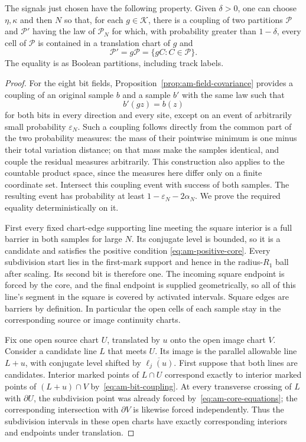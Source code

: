\begin{lemma}\label{lem:am-partition-coupling}
The signals just chosen have the following property.  Given $\delta>0$,
one can choose $\eta,\kappa$ and then $N$ so that, for each
$g\in\mathcal K$, there is a coupling of two partitions $\mathcal P$ and
$\mathcal P'$ having the law of $\mathcal P_N$ for which, with probability
greater than $1-\delta$, every cell of $\mathcal P$ is contained in a
translation chart of $g$ and
\[
 \mathcal P'=g\mathcal P=\{gC:C\in\mathcal P\}.
\]
The equality is as Boolean partitions, including track labels.
\end{lemma}

\begin{proof}
For the eight bit fields, Proposition~\ref{prop:am-field-covariance}
provides a coupling of an original sample $b$ and a sample $b'$ with the
same law such that
\begin{equation}\label{eq:am-bit-coupling}
 b'(gz)=b(z)
\end{equation}
for both bits in every direction and every site, except on an event of
arbitrarily small probability $\varepsilon_N$.  Such a coupling follows
directly from the common part of the two probability measures: the mass
of their pointwise minimum is one minus their total variation distance;
on that mass make the samples identical, and couple the residual measures
arbitrarily.  This construction also applies to the countable product
space, since the measures here differ only on a finite coordinate set.
Intersect this coupling event with success of both samples.  The resulting
event has probability at least $1-\varepsilon_N-2\alpha_N$.
We prove the required equality deterministically on it.

First every fixed chart-edge supporting line meeting the square interior
is a full barrier in both samples for large $N$.  Its conjugate level is
bounded, so it is a candidate and satisfies the positive condition
\eqref{eq:am-positive-core}.  Every subdivision start lies in the first-mark
support and hence in the radius-$R_1$ ball after scaling.  Its second bit
is therefore one.  The incoming square endpoint is forced by the core,
and the final endpoint is supplied geometrically, so all of this line's
segment in the square is covered by activated intervals.  Square edges
are barriers by definition.  In particular the open cells of each sample
stay in the corresponding source or image continuity charts.

Fix one open source chart $U$, translated by $u$ onto the open image chart
$V$.  Consider a candidate line $L$ that meets $U$.  Its image is the
parallel allowable line $L+u$, with conjugate level shifted by
$\overline{\ell_j(u)}$.  First suppose that both lines are candidates.
Interior marked points of $L\cap U$ correspond exactly to interior marked
points of $(L+u)\cap V$ by~\eqref{eq:am-bit-coupling}.  At every transverse
crossing of $L$ with $\partial U$, the subdivision point was already
forced by~\eqref{eq:am-core-equations}; the corresponding intersection
with $\partial V$ is likewise forced independently.  Thus the subdivision
intervals in these open charts have exactly corresponding interiors and
endpoints under translation.


\end{proof}
